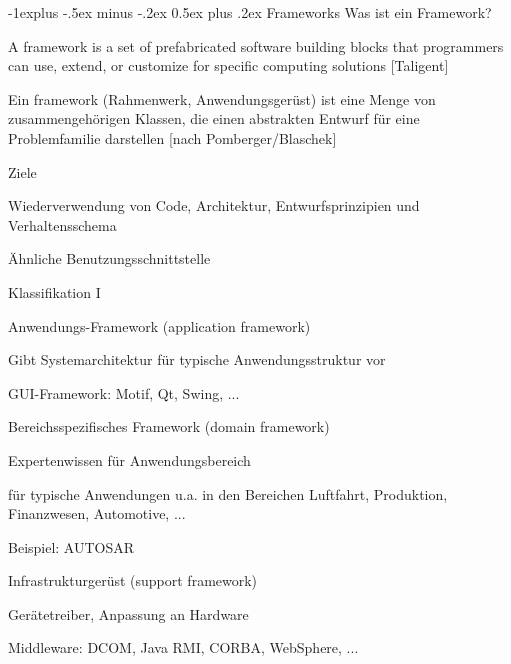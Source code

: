 \documentclass[a4paper]{article}
\makeatletter
\renewcommand{\subsection}{\@startsection{subsection}{2}{0mm}%
                                {-1explus -.5ex minus -.2ex}%
                                {0.5ex plus .2ex}%
                                {\normalfont\normalsize\bfseries}}
\makeatother
\begin{document}
\begin{multicols}{3}
  \subsection{Frameworks}
  Was ist ein Framework?
  \begin{itemize*}
    \item A framework is a set of prefabricated software building blocks that programmers can use, extend, or customize for specific computing solutions [Taligent]
    \item Ein framework (Rahmenwerk, Anwendungsgerüst) ist eine Menge von zusammengehörigen Klassen, die einen abstrakten Entwurf für eine Problemfamilie darstellen [nach Pomberger/Blaschek]
  \end{itemize*}

  Ziele
  \begin{itemize*}
    \item Wiederverwendung von Code, Architektur, Entwurfsprinzipien und Verhaltensschema
    \item Ähnliche Benutzungsschnittstelle
  \end{itemize*}

  Klassifikation I
  \begin{itemize*}
    \item Anwendungs-Framework (application framework)
    \begin{itemize*}
      \item Gibt Systemarchitektur für typische Anwendungsstruktur vor
      \item GUI-Framework: Motif, Qt, Swing, ...
    \end{itemize*}
    \item Bereichsspezifisches Framework (domain framework)
    \begin{itemize*}
      \item Expertenwissen für Anwendungsbereich
      \item für typische Anwendungen u.a. in den Bereichen Luftfahrt, Produktion, Finanzwesen, Automotive, ...
      \item Beispiel: AUTOSAR
    \end{itemize*}
    \item Infrastrukturgerüst (support framework)
    \begin{itemize*}
      \item Gerätetreiber, Anpassung an Hardware
      \item Middleware: DCOM, Java RMI, CORBA, WebSphere, ...
    \end{itemize*}
  \end{itemize*}


\end{multicols}
\end{document}
